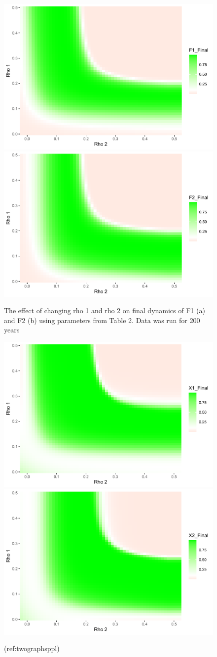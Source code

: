 \documentclass[
]{article}
\begin{document}
\begin{figure}
\includegraphics[width=0.5\linewidth]{Review1_NewFigsNotes_files/figure-latex/TwoGraphsFish-1} \includegraphics[width=0.5\linewidth]{Review1_NewFigsNotes_files/figure-latex/TwoGraphsFish-2} \caption{The effect of changing rho 1 and rho 2 on final dynamics of F1 (a) and F2 (b) using parameters from Table 2. Data was run for 200 years \label{TwoGraphsFish}}\label{fig:TwoGraphsFish}
\end{figure}

\begin{figure}
\includegraphics[width=0.5\linewidth]{Review1_NewFigsNotes_files/figure-latex/TwoGraphsPpl-1} \includegraphics[width=0.5\linewidth]{Review1_NewFigsNotes_files/figure-latex/TwoGraphsPpl-2} \caption{(ref:twographsppl) \label{TwoGraphsPpl}}\label{fig:TwoGraphsPpl}
\end{figure}
\end{document}
